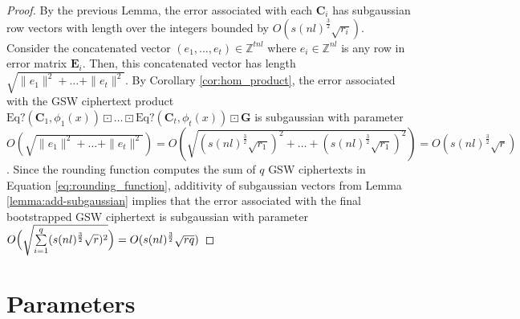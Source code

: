 \begin{proof}
    By the previous Lemma, the error associated with each $\mathbf{C}_i$ has subgaussian row vectors with length over the integers bounded by $O(s(nl)^\frac{3}{2}\sqrt{r_i})$. Consider the concatenated vector $(e_1, \dots, e_{t}) \in \mathbb{Z}^{tnl}$ where $e_i \in \mathbb{Z}^{nl}$ is any row in error matrix $\mathbf{E}_i$. Then, this concatenated vector has length $\sqrt{\|e_1\|^2 + \dots + \|e_t\|^2}$. By Corollary \ref{cor:hom_product}, the error associated with the GSW ciphertext product $\text{Eq?}(\mathbf{C}_1, \phi_1(x)) \boxdot \dots \boxdot \text{Eq?}(\mathbf{C}_t, \phi_t(x)) \boxdot \mathbf{G}$ is subgaussian with parameter $O(\sqrt{\|e_1\|^2 + \dots + \|e_t\|^2}) = O(\sqrt{(s(nl)^\frac{3}{2}\sqrt{r_1})^2 + \dots + (s(nl)^\frac{3}{2}\sqrt{r_1})^2}) = O(s(nl)^\frac{3}{2}\sqrt{r})$. Since the rounding function computes the sum of $q$ GSW ciphertexts in Equation \ref{eq:rounding_function}, additivity of subgaussian vectors from Lemma \ref{lemma:add-subgaussian} implies that the error associated with the final bootstrapped GSW ciphertext is subgaussian with parameter $O\Bigl(\sqrt{\sum\limits_{i = 1}^{q}(s(nl)^\frac{3}{2}\sqrt{r})^2}\Bigr) = O(s(nl)^\frac{3}{2}\sqrt{rq})$
\end{proof}


\section{Parameters}



